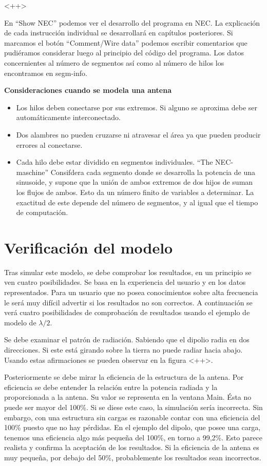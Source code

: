 \documentclass[12pt]{article}
\begin{document}
<++> 

En “Show NEC” podemos ver el desarrollo del programa en NEC. La explicación de
cada instrucción individual se desarrollará en capítulos posteriores. Si
marcamos el botón ``Comment/Wire data'' podemos escribir comentarios que
pudiéramos considerar luego al principio del código del programa. Los datos
concernientes al número de segmentos así como al número de hilos los
encontramos en segm-info.

\textbf{Consideraciones cuando se modela una antena}

\begin{itemize}%
    \item Los hilos deben conectarse por sus extremos. Si alguno se aproxima
	debe ser autom\'aticamente interconectado.
    \item Dos alambres no pueden cruzarse ni atravesar el \'area ya que pueden
	producir errores al conectarse.
    \item Cada hilo debe estar dividido en segmentos individuales. ``The
	NEC-maschine'' Consifdera cada segmento donde se desarrolla la potencia
	de una sinusoide, y supone que la uni\'on de ambos extremos de dos
	hijos de suman los flujos de ambos. Esto da un n\'umero finito de
	variables a determinar. La exactitud de este depende del n\'umero de
	segmentos, y al igual que el tiempo de computaci\'on.
\end{itemize}

\section{Verificaci\'on del modelo}

Tras simular este modelo, se debe comprobar los resultados, en un principio se
ven cuatro posibilidades. Se basa en la experiencia del usuario y en los datos
representados. Para un usuario que no posea conocimientos sobre alta frecuencia
le ser\'a muy difícil advertir si los resultados no son correctos. A
continuaci\'on se ver\'a cuatro posibilidades de comprobaci\'on de resultados
usando el ejemplo de modelo de $\lambda/2$.

Se debe examinar el patr\'on de radiaci\'on. Sabiendo que el dipolio radia en
dos direcciones. Si este est\'a girando sobre la tierra no puede radiar hacia
abajo. Usando estas afirmaciones se pueden observar en la figura <++>.

Posteriormente se debe mirar la eficiencia de la estructura de la antena. Por
eficiencia se debe entender la relación entre la potencia radiada y la
proporcionada a la antena. Su valor se representa en la ventana Main. Ésta no
puede ser mayor del 100\%. Si se diese este caso, la simulación sería
incorrecta. Sin embargo, con una estructura sin cargas es razonable contar con
una eficiencia del 100\% puesto que no hay pérdidas. En el ejemplo del dipolo,
que posee una carga, tenemos una eficiencia algo más pequeña del 100\%, en
torno a 99,2\%. Esto parece realista y confirma la aceptación de los
resultados. Si la eficiencia de la antena es muy pequeña, por debajo del 50\%,
probablemente los resultados sean incorrectos.
\end{document}
